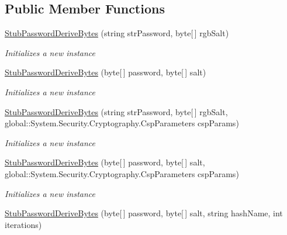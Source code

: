 \subsection*{Public Member Functions}
\begin{DoxyCompactItemize}
\item 
\hyperlink{class_system_1_1_security_1_1_cryptography_1_1_fakes_1_1_stub_password_derive_bytes_af21fd9240873a70b6fd74e2e60a0e38c}{Stub\-Password\-Derive\-Bytes} (string str\-Password, byte\mbox{[}$\,$\mbox{]} rgb\-Salt)
\begin{DoxyCompactList}\small\item\em Initializes a new instance\end{DoxyCompactList}\item 
\hyperlink{class_system_1_1_security_1_1_cryptography_1_1_fakes_1_1_stub_password_derive_bytes_a77997fa6284dc92a6dcb51bc07e954c4}{Stub\-Password\-Derive\-Bytes} (byte\mbox{[}$\,$\mbox{]} password, byte\mbox{[}$\,$\mbox{]} salt)
\begin{DoxyCompactList}\small\item\em Initializes a new instance\end{DoxyCompactList}\item 
\hyperlink{class_system_1_1_security_1_1_cryptography_1_1_fakes_1_1_stub_password_derive_bytes_af9b0a19bdd00a3c5787504057d1d138a}{Stub\-Password\-Derive\-Bytes} (string str\-Password, byte\mbox{[}$\,$\mbox{]} rgb\-Salt, global\-::\-System.\-Security.\-Cryptography.\-Csp\-Parameters csp\-Params)
\begin{DoxyCompactList}\small\item\em Initializes a new instance\end{DoxyCompactList}\item 
\hyperlink{class_system_1_1_security_1_1_cryptography_1_1_fakes_1_1_stub_password_derive_bytes_a1cf9f7d72bd974f56f70bb9cb0a916ca}{Stub\-Password\-Derive\-Bytes} (byte\mbox{[}$\,$\mbox{]} password, byte\mbox{[}$\,$\mbox{]} salt, global\-::\-System.\-Security.\-Cryptography.\-Csp\-Parameters csp\-Params)
\begin{DoxyCompactList}\small\item\em Initializes a new instance\end{DoxyCompactList}\item 
\hyperlink{class_system_1_1_security_1_1_cryptography_1_1_fakes_1_1_stub_password_derive_bytes_a7b5e6b7bb794f4756349edf1459f6f31}{Stub\-Password\-Derive\-Bytes} (byte\mbox{[}$\,$\mbox{]} password, byte\mbox{[}$\,$\mbox{]} salt, string hash\-Name, int iterations)

\end{DoxyCompactItemize}
